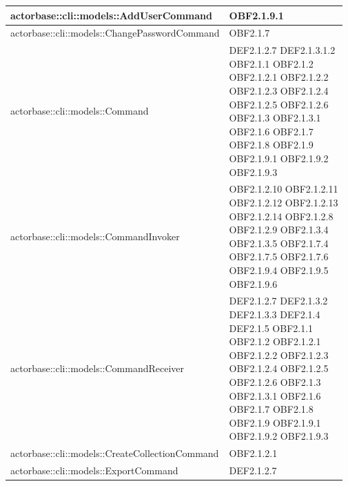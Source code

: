 \documentclass{scalatekids-article}
\begin{document}
\begin{longtable}[H]{|p{12cm}|p{5.5cm}|}
  actorbase::cli::models::AddUserCommand & \multiLineCell[t]{OBF2.1.9.1\\}\\
  \hline
  actorbase::cli::models::ChangePasswordCommand & \multiLineCell[t]{OBF2.1.7\\}\\
  \hline
  actorbase::cli::models::Command & \multiLineCell[t]{DEF2.1.2.7 DEF2.1.3.1.2\\OBF2.1.1 OBF2.1.2\\OBF2.1.2.1 OBF2.1.2.2\\OBF2.1.2.3 OBF2.1.2.4\\OBF2.1.2.5 OBF2.1.2.6\\OBF2.1.3 OBF2.1.3.1\\OBF2.1.6 OBF2.1.7\\OBF2.1.8 OBF2.1.9\\OBF2.1.9.1 OBF2.1.9.2\\OBF2.1.9.3}\\
  \hline
  actorbase::cli::models::CommandInvoker & \multiLineCell[t]{OBF2.1.2.10 OBF2.1.2.11\\OBF2.1.2.12 OBF2.1.2.13\\OBF2.1.2.14 OBF2.1.2.8\\OBF2.1.2.9 OBF2.1.3.4\\OBF2.1.3.5 OBF2.1.7.4\\OBF2.1.7.5 OBF2.1.7.6\\OBF2.1.9.4 OBF2.1.9.5\\OBF2.1.9.6}\\
  \hline
  actorbase::cli::models::CommandReceiver & \multiLineCell[t]{DEF2.1.2.7 DEF2.1.3.2\\DEF2.1.3.3 DEF2.1.4\\DEF2.1.5 OBF2.1.1\\OBF2.1.2 OBF2.1.2.1\\OBF2.1.2.2 OBF2.1.2.3\\OBF2.1.2.4 OBF2.1.2.5\\OBF2.1.2.6 OBF2.1.3\\OBF2.1.3.1 OBF2.1.6\\OBF2.1.7 OBF2.1.8\\OBF2.1.9 OBF2.1.9.1\\OBF2.1.9.2 OBF2.1.9.3\\}\\
  \hline
  actorbase::cli::models::CreateCollectionCommand & \multiLineCell[t]{OBF2.1.2.1\\}\\
  \hline
  actorbase::cli::models::ExportCommand & \multiLineCell[t]{DEF2.1.2.7\\}\\

\end{longtable}
\end{document}
